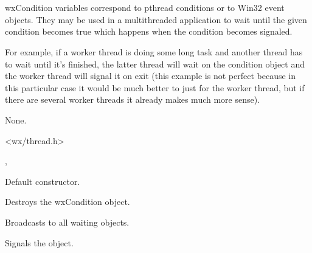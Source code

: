 \section{}\label{wxcondition}

wxCondition variables correspond to pthread conditions or to Win32 event
objects. They may be used in a multithreaded application to wait until the
given condition becomes true which happens when the condition becomes signaled.

For example, if a worker thread is doing some long task and another thread has
to wait until it's finished, the latter thread will wait on the condition
object and the worker thread will signal it on exit (this example is not
perfect because in this particular case it would be much better to just 
 for the worker thread, but if there are several
worker threads it already makes much more sense).


None.


<wx/thread.h>


, 


\label{wxconditionconstr}


Default constructor.



Destroys the wxCondition object.

\label{wxconditionbroadcast}


Broadcasts to all waiting objects.

\label{wxconditionsignal}


Signals the object.

\label{wxconditionwait}


